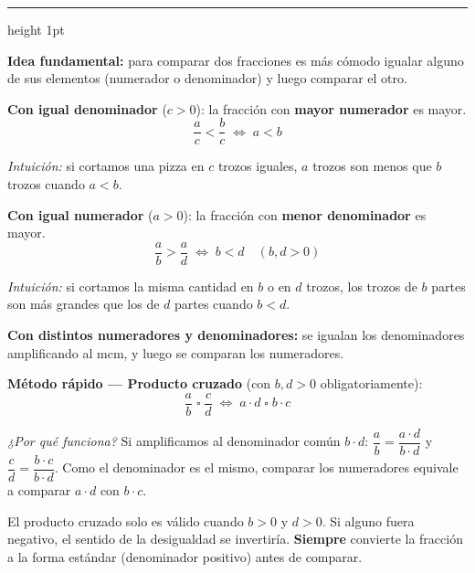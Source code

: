 \documentclass[11pt, letterpaper]{article}
\newcommand{\subbloque}[1]{%
  \vspace{14pt}
  \noindent{\large\bfseries\color{zenitnavy} #1}\par
  \vspace{4pt}\hrule height 1pt\vspace{8pt}}
\begin{document}
\subbloque{3.1 Comparaci\'on de fracciones}
\label{sub:3.1}

\begin{tcolorbox}[importantbox, title={Comparaci\'on de fracciones}]
\noindent\textbf{Idea fundamental:} para comparar dos fracciones es m\'as c\'omodo igualar alguno de sus elementos (numerador o denominador) y luego comparar el otro.

\medskip

\noindent\textbf{Con igual denominador} ($c > 0$): la fracci\'on con \textbf{mayor numerador} es mayor.
$$\frac{a}{c} < \frac{b}{c} \;\Longleftrightarrow\; a < b$$

\noindent\textit{Intuici\'on:} si cortamos una pizza en $c$ trozos iguales, $a$ trozos son menos que $b$ trozos cuando $a<b$.

\medskip

\noindent\textbf{Con igual numerador} ($a > 0$): la fracci\'on con \textbf{menor denominador} es mayor.
$$\frac{a}{b} > \frac{a}{d} \;\Longleftrightarrow\; b < d \quad (b,d>0)$$

\noindent\textit{Intuici\'on:} si cortamos la misma cantidad en $b$ o en $d$ trozos, los trozos de $b$ partes son m\'as grandes que los de $d$ partes cuando $b<d$.

\medskip

\noindent\textbf{Con distintos numeradores y denominadores:} se igualan los denominadores amplificando al $\text{mcm}$, y luego se comparan los numeradores.

\medskip

\noindent\textbf{M\'etodo r\'apido --- Producto cruzado} (con $b,d > 0$ obligatoriamente):
$$\frac{a}{b} \;\square\; \frac{c}{d} \;\Longleftrightarrow\; a \cdot d \;\square\; b \cdot c$$

\noindent\textit{¿Por qu\'e funciona?} Si amplificamos al denominador com\'un $b\cdot d$: $\dfrac{a}{b}=\dfrac{a\cdot d}{b\cdot d}$ y $\dfrac{c}{d}=\dfrac{b\cdot c}{b\cdot d}$. Como el denominador es el mismo, comparar los numeradores equivale a comparar $a\cdot d$ con $b\cdot c$.

\medskip
\begin{tcolorbox}[warningbox, title={¡Atenci\'on con los denominadores negativos!}]
El producto cruzado solo es v\'alido cuando $b>0$ y $d>0$. Si alguno fuera negativo, el sentido de la desigualdad se invertir\'ia. \textbf{Siempre} convierte la fracci\'on a la forma est\'andar (denominador positivo) antes de comparar.
\end{tcolorbox}
\end{tcolorbox}
\end{document}
